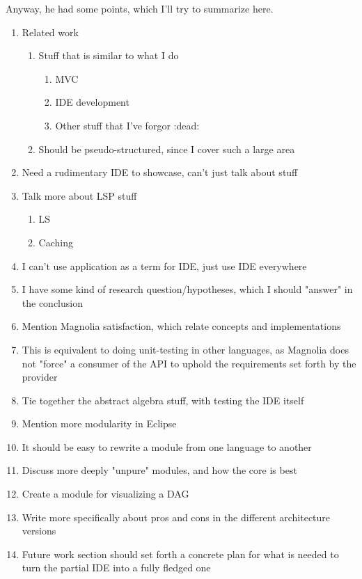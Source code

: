 Anyway, he had some points, which I'll try to summarize here.

\begin{enumerate}
  \item Related work
    \begin{enumerate}
      \item Stuff that is similar to what I do
        \begin{enumerate}
          \item MVC
          \item IDE development
          \item Other stuff that I've forgor :dead:
        \end{enumerate}
      \item Should be pseudo-structured, since I cover such a large area
    \end{enumerate}
  \item Need a rudimentary IDE to showcase, can't just talk about stuff
  \item Talk more about LSP stuff
    \begin{enumerate}
      \item LS
      \item Caching
    \end{enumerate}
  \item I can't use application as a term for IDE, just use IDE everywhere
  \item I have some kind of research question/hypotheses, which I should "answer"
    in the conclusion
  \item Mention Magnolia satisfaction, which relate concepts and implementations
  \item This is equivalent to doing unit-testing in other languages, as Magnolia
    does not "force" a consumer of the API to uphold the requirements set forth
    by the provider
  \item Tie together the abstract algebra stuff, with testing the IDE itself
  \item Mention more modularity in Eclipse
  \item It should be easy to rewrite a module from one language to another
  \item Discuss more deeply "unpure" modules, and how the core is best
  \item Create a module for visualizing a DAG
  \item Write more specifically about pros and cons in the different
    architecture versions
  \item Future work section should set forth a concrete plan for what is needed
    to turn the partial IDE into a fully fledged one
\end{enumerate}
